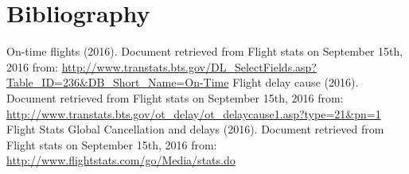 \documentclass{article}
\begin{document}
    \section{Bibliography}
    On-time flights (2016). Document retrieved from Flight stats on September 15th, 2016 from: \url{http://www.transtats.bts.gov/DL\_SelectFields.asp?Table\_ID=236\&DB\_Short\_Name=On-Time}\newline\newline
    Flight delay cause (2016). Document retrieved from Flight stats on September 15th, 2016 from: \url{http://www.transtats.bts.gov/ot\_delay/ot\_delaycause1.asp?type=21\&pn=1}\newline\newline
    Flight Stats Global Cancellation and delays (2016). Document retrieved from Flight stats on September 15th, 2016 from: \url{http://www.flightstats.com/go/Media/stats.do}\newline
\end{document}
